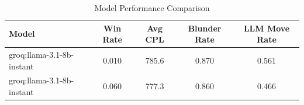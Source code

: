 \begin{table}[h]
\centering
\caption{Model Performance Comparison}
\begin{tabular}{lcccc}
\toprule
Model & Win Rate & Avg CPL & Blunder Rate & LLM Move Rate \\
\midrule
groq:llama-3.1-8b-instant & 0.010 & 785.6 & 0.870 & 0.561 \\
groq:llama-3.1-8b-instant & 0.060 & 777.3 & 0.860 & 0.466 \\
\bottomrule
\end{tabular}
\end{table}